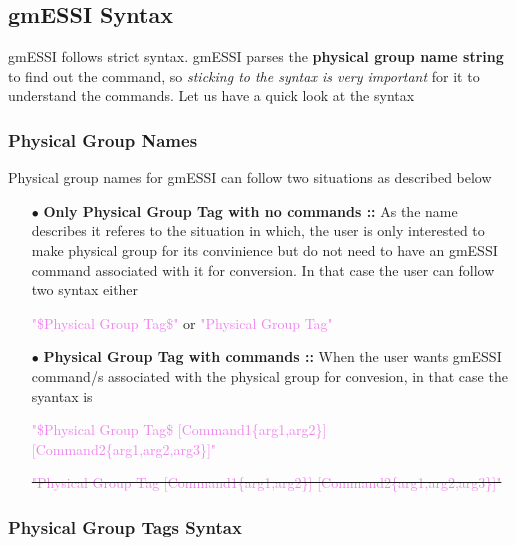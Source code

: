 \documentclass[11pt]{article}
\begin{document}
\subsection{gmESSI Syntax}

gmESSI follows strict syntax. gmESSI parses the \textbf{physical group name
string} to find out the command, so \textit{sticking to the syntax is very
important} for it to understand the commands. Let us have a quick look at the
syntax

\subsubsection{Physical Group Names}

Physical group names for gmESSI can follow two situations as described below

\begin{itemize}

  \item[$\bullet$] \textbf{Only Physical Group Tag with no commands ::} 
  As the name describes it referes to the situation in which, the user is only 
  interested to make physical group for its convinience but do not need to have 
  an gmESSI command associated with it for conversion. In that case the user  
  can follow two syntax either\\    
  \centerline {\textcolor{violet}{"\$Physical Group Tag\$"} or 
  \textcolor{violet}{"Physical Group Tag"}}

  \item[$\bullet$] \textbf{Physical Group Tag with commands ::} When the user
  wants gmESSI command/s associated with the physical group for convesion,    in
  that case the syantax is \\ 

  \centerline {\textcolor{violet}{"\$Physical
  Group Tag\$ [Command1\{arg1,arg2\}]  [Command2\{arg1,arg2,arg3\}]"}}

  \centerline{\sout{\textcolor{violet}{"Physical Group Tag
  [Command1\{arg1,arg2\}]  [Command2\{arg1,arg2,arg3\}]"}}} 

\end {itemize}

\subsubsection{Physical Group Tags Syntax}
\end{document}
